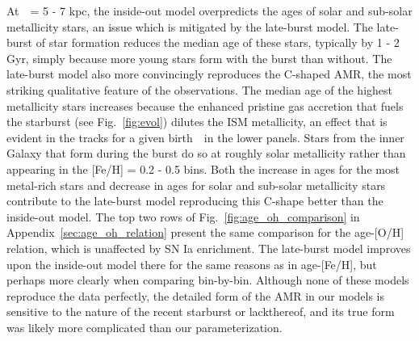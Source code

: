 \documentclass[draft2.tex]{subfiles}
\begin{document}
{\color{red} 
At~\rgal~= 5 - 7 kpc, the inside-out model overpredicts the ages of solar and 
sub-solar metallicity stars, an issue which is mitigated by the late-burst 
model. 
The late-burst of star formation reduces the median age of these stars, 
typically by 1 - 2 Gyr, simply because more young stars form with the burst 
than without. 
The late-burst model also more convincingly reproduces the C-shaped AMR, the 
most striking qualitative feature of the observations. 
} 
The median age of the highest metallicity stars increases because the enhanced 
pristine gas accretion that fuels the starburst (see Fig.~\ref{fig:evol}) 
dilutes the ISM metallicity, an effect that is evident in the tracks for a 
given birth~\rgal~in the lower panels. 
Stars from the inner Galaxy that form during the burst do so at roughly solar 
metallicity rather than appearing in the [Fe/H] = 0.2 - 0.5 bins. 
{\color{red} 
Both the increase in ages for the most metal-rich stars and decrease in ages 
for solar and sub-solar metallicity stars contribute to the late-burst model 
reproducing this C-shape better than the inside-out model. 
The top two rows of Fig.~\ref{fig:age_oh_comparison} in 
Appendix~\ref{sec:age_oh_relation} present the same comparison for the 
age-[O/H] relation, which is unaffected by SN Ia enrichment. 
The late-burst model improves upon the inside-out model there for the same 
reasons as in age-[Fe/H], but perhaps more clearly when comparing bin-by-bin. 
Although none of these models reproduce the data perfectly, the detailed form 
of the AMR in our models is sensitive to the nature of the recent starburst or 
lackthereof, and its true form was likely more complicated than our 
parameterization. 
} 
\par 
\end{document}
